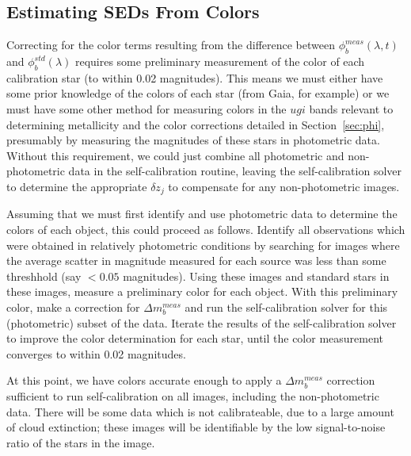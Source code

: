 \documentclass[12pt,preprint]{aastex}
\begin{document}
\subsection{Estimating SEDs From Colors}

Correcting for the color terms resulting from the difference between
$\phi_b^{meas}(\lambda,t)$ and $\phi_b^{std}(\lambda)$ requires some
preliminary measurement of the color of each calibration star (to
within 0.02 magnitudes).  This means we must either have some prior
knowledge of the colors of each star (from Gaia, for example) or we
must have some other method for measuring colors in the $ugi$ bands
relevant to determining metallicity and the color corrections detailed
in Section~\ref{sec:phi}, presumably by measuring the magnitudes of
these stars in photometric data.  Without
this requirement, we could just combine all photometric and
non-photometric data in the self-calibration routine, leaving the
self-calibration solver to determine the appropriate $\delta z_j$ to
compensate for any non-photometric images.

Assuming that we must first identify and use photometric data to
determine the colors of each object, this could proceed as follows. 
Identify all observations which were obtained in relatively
photometric conditions by searching for images where the average
scatter in magnitude measured for each source was less than some
threshhold (say $<0.05$ magnitudes). Using these images and standard
stars in these images, measure a preliminary color for each
object. With this preliminary color, make a correction for $\Delta
m_b^{meas}$ and run the self-calibration solver for this (photometric) subset of the
data. Iterate the results of the self-calibration solver to improve
the color determination for each star, until the color measurement
converges to within 0.02 magnitudes. 

At this point, we have colors accurate enough to apply a $\Delta
m_b^{meas}$ correction sufficient to run self-calibration on all
images, including the non-photometric data.  There will be some data
which is not calibrateable, due to a large amount of cloud
extinction; these images will be identifiable by the low
signal-to-noise ratio of the stars in the image. 
\end{document}
